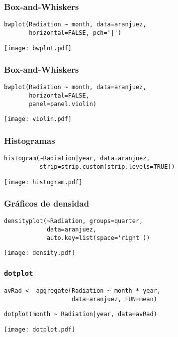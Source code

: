 \documentclass[xcolor={usenames,svgnames,dvipsnames}]{beamer}
\begin{document}
\begin{frame}[fragile]
\frametitle{Box-and-Whiskers}
\label{sec-2-1-16}


\lstset{language=R}
\begin{lstlisting}
bwplot(Radiation ~ month, data=aranjuez,
       horizontal=FALSE, pch='|')
\end{lstlisting}

\texttt{[image: bwplot.pdf]}
\end{frame}
\begin{frame}[fragile]
\frametitle{Box-and-Whiskers}
\label{sec-2-1-17}


\lstset{language=R}
\begin{lstlisting}
bwplot(Radiation ~ month, data=aranjuez,
       horizontal=FALSE,
       panel=panel.violin)
\end{lstlisting}

\texttt{[image: violin.pdf]}

    
\end{frame}
\begin{frame}[fragile]
\frametitle{Histogramas}
\label{sec-2-1-18}


\lstset{language=R}
\begin{lstlisting}
histogram(~Radiation|year, data=aranjuez,
          strip=strip.custom(strip.levels=TRUE))
\end{lstlisting}

\texttt{[image: histogram.pdf]}
\end{frame}
\begin{frame}[fragile]
\frametitle{Gráficos de densidad}
\label{sec-2-1-19}


\lstset{language=R}
\begin{lstlisting}
densityplot(~Radiation, groups=quarter,
            data=aranjuez,
            auto.key=list(space='right'))
\end{lstlisting}

\texttt{[image: density.pdf]}
\end{frame}
\begin{frame}[fragile]
\frametitle{\texttt{dotplot}}
\label{sec-2-1-20}


\lstset{language=R}
\begin{lstlisting}
avRad <- aggregate(Radiation ~ month * year,
                   data=aranjuez, FUN=mean)
\end{lstlisting}



\lstset{language=R}
\begin{lstlisting}
dotplot(month ~ Radiation|year, data=avRad)
\end{lstlisting}

\texttt{[image: dotplot.pdf]}
\end{frame}
\end{document}
